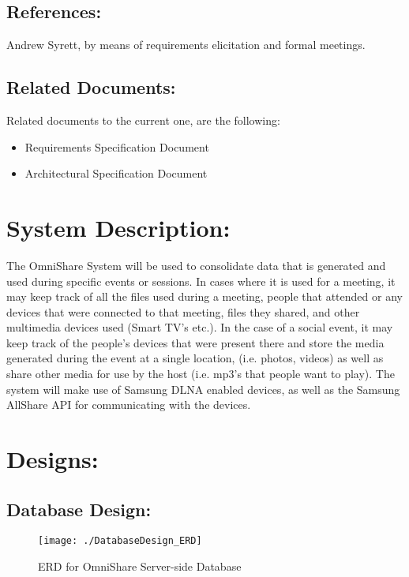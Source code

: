 \documentclass[12pt]{article}
\begin{document}
\subsection{References:}
Andrew Syrett, by means of requirements elicitation and formal meetings.

\subsection{Related Documents:}
Related documents to the current one, are the following:
\begin{itemize}
\item Requirements Specification Document
\item Architectural Specification Document
\end{itemize}

\newpage
\section{System Description:}
The OmniShare System will be used to consolidate data that is generated and used during specific events or sessions. In cases where it is used for a meeting, it may keep track of all the files used during a meeting, people that attended
or any devices that were connected to that meeting, files they shared, and other multimedia devices used (Smart TV's etc.). In the case of a social event, it may keep track of the people's devices that were present there and store the media generated during the event at a single location, (i.e. photos, videos) as well as share other media for use by the host (i.e. mp3's that people want to play). The system will make use of Samsung DLNA enabled devices, as well as the Samsung AllShare API for communicating with the devices.

\newpage
\section{Designs:}
\subsection{Database Design:}

\begin{figure}[htbp]
\centering
\texttt{[image: ./DatabaseDesign\_ERD]}
\caption{ERD for OmniShare Server-side Database}
\label{fig:DatabaseDesign_ERD}
\end{figure}

\newpage
\end{document}
